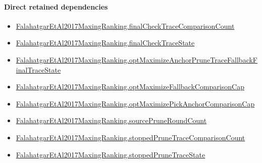 \documentclass[10pt]{article}
\begin{document}
\paragraph{Direct retained dependencies}
\begin{itemize}\raggedright
\item \hyperlink{governing-declaration-c4d4670a62256e05}{Falahatgar\allowbreak{}Et\allowbreak{}Al2017\allowbreak{}Maxing\allowbreak{}Ranking.\allowbreak{}final\allowbreak{}Check\allowbreak{}Trace\allowbreak{}Comparison\allowbreak{}Count}
\item \hyperlink{governing-declaration-2122ec79de2b6bf8}{Falahatgar\allowbreak{}Et\allowbreak{}Al2017\allowbreak{}Maxing\allowbreak{}Ranking.\allowbreak{}final\allowbreak{}Check\allowbreak{}Trace\allowbreak{}State}
\item \hyperlink{governing-declaration-25e49fb93f2a2a90}{Falahatgar\allowbreak{}Et\allowbreak{}Al2017\allowbreak{}Maxing\allowbreak{}Ranking.\allowbreak{}opt\allowbreak{}Maximize\allowbreak{}Anchor\allowbreak{}Prune\allowbreak{}Trace\allowbreak{}Fallback\allowbreak{}Final\allowbreak{}Trace\allowbreak{}State}
\item \hyperlink{governing-declaration-c13ae235f0b12965}{Falahatgar\allowbreak{}Et\allowbreak{}Al2017\allowbreak{}Maxing\allowbreak{}Ranking.\allowbreak{}opt\allowbreak{}Maximize\allowbreak{}Fallback\allowbreak{}Comparison\allowbreak{}Cap}
\item \hyperlink{governing-declaration-074d897c84ea30a6}{Falahatgar\allowbreak{}Et\allowbreak{}Al2017\allowbreak{}Maxing\allowbreak{}Ranking.\allowbreak{}opt\allowbreak{}Maximize\allowbreak{}Pick\allowbreak{}Anchor\allowbreak{}Comparison\allowbreak{}Cap}
\item \hyperlink{governing-declaration-7a4a97da03826b66}{Falahatgar\allowbreak{}Et\allowbreak{}Al2017\allowbreak{}Maxing\allowbreak{}Ranking.\allowbreak{}source\allowbreak{}Prune\allowbreak{}Round\allowbreak{}Count}
\item \hyperlink{governing-declaration-35a38588d49521f4}{Falahatgar\allowbreak{}Et\allowbreak{}Al2017\allowbreak{}Maxing\allowbreak{}Ranking.\allowbreak{}stopped\allowbreak{}Prune\allowbreak{}Trace\allowbreak{}Comparison\allowbreak{}Count}
\item \hyperlink{governing-declaration-bb5991f407529737}{Falahatgar\allowbreak{}Et\allowbreak{}Al2017\allowbreak{}Maxing\allowbreak{}Ranking.\allowbreak{}stopped\allowbreak{}Prune\allowbreak{}Trace\allowbreak{}State}
\end{itemize}
\hypertarget{governing-declaration-e0ac55e8a5771efa}{}
\end{document}
